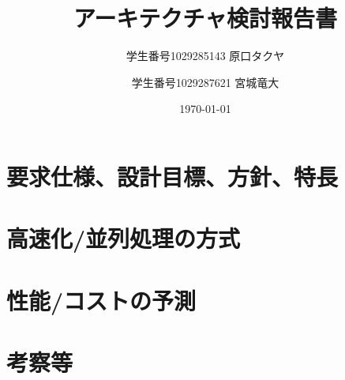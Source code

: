 \documentclass{jsreport}
\title{アーキテクチャ検討報告書}
\author{学生番号1029285143 原口タクヤ \and 学生番号1029287621 宮城竜大}
\date{\today}
\begin{document}
\begin{titlepage}
\maketitle
\clearpage
\end{titlepage}

\section{要求仕様、設計目標、方針、特長}

\section{高速化/並列処理の方式}

\section{性能/コストの予測}
\section{考察等}
\end{document}

